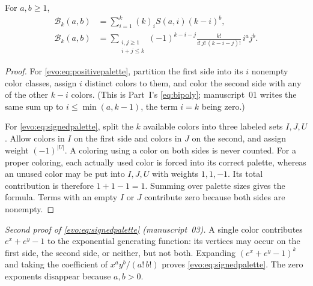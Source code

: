 \documentclass[11pt,a4paper]{article}
\numberwithin{equation}{section}
\theoremstyle{definition}
\theoremstyle{remark}
\newcommand{\fall}[2]{(#1)_{#2}}
\newcommand{\Bip}{\mathcal B}
\begin{document}
\begin{proposition}\label{evo:prop:palette}
For $a,b\ge1$,
\begin{align}
\Bip_k(a,b)
 &=\sum_{i=1}^{k}\fall{k}{i}S(a,i)(k-i)^b,
 \label{evo:eq:positivepalette}\\
\Bip_k(a,b)
 &=\sum_{\substack{i,j\ge1\\i+j\le k}}
 (-1)^{k-i-j}\frac{k!}{i!\,j!\,(k-i-j)!}\,i^aj^b.
 \label{evo:eq:signedpalette}
\end{align}
\end{proposition}
\begin{proof}
For \eqref{evo:eq:positivepalette}, partition the first side into its $i$
nonempty color classes, assign $i$ distinct colors to them, and color the
second side with any of the other $k-i$ colors. (This is Part~I's
\eqref{eq:bipoly}; manuscript~01 writes the same sum up to $i\le
\min(a,k-1)$, the term $i=k$ being zero.)

For \eqref{evo:eq:signedpalette}, split the $k$ available colors into three
labeled sets $I,J,U$. Allow colors in $I$ on the first side and colors in $J$
on the second, and assign weight $(-1)^{|U|}$. A coloring using a color on
both sides is never counted. For a proper coloring, each actually used color
is forced into its correct palette, whereas an unused color may be put into
$I,J,U$ with weights $1,1,-1$. Its total contribution is therefore $1+1-1=1$.
Summing over palette sizes gives the formula. Terms with an empty $I$ or $J$
contribute zero because both sides are nonempty.
\end{proof}

\noindent\emph{Second proof of \eqref{evo:eq:signedpalette} (manuscript~03).}
A single color contributes $e^x+e^y-1$ to the exponential generating
function: its vertices may occur on the first side, the second side, or
neither, but not both. Expanding $(e^x+e^y-1)^k$ and taking the coefficient
of $x^ay^b/(a!\,b!)$ proves \eqref{evo:eq:signedpalette}. The zero exponents
disappear because $a,b>0$.
\end{document}
